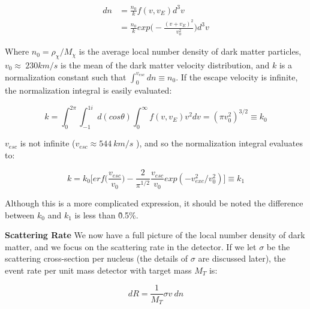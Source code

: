 \begin{equation}
\begin{split}
dn &= \frac{n_{0}}{k} f(v, v_{E}) d^{3}v \\
     &= \frac{n_{0}}{k} exp \Big( - \frac{(v + v_{E})^{2} }{ v_{0}^{2}} \Big) d^{3}v 
\end{split}
\end{equation}

Where $n_{0} = \rho_{\chi}/M_{\chi}$ is the average local number density of dark matter particles, $v_{0} \approx~230km/s$ \cite{Lewin1996} is the mean of the dark matter velocity distribution, and $k$ is a normalization constant such that $\int_{0}^{v_{esc}} dn \equiv n_{0}$. If the escape velocity is infinite, the normalization integral is easily evaluated:

\begin{equation}
k = \int_{0}^{2\pi} \int_{-1}^{1i} d(cos\theta)  \int_{0}^{\infty} f(v, v_{E}) v^{2}dv = (\pi v_{0}^{2})^{3/2} \equiv k_{0}
\end{equation}

$v_{esc}$ is not infinite ($v_{esc} \approx 544~km/s$ \cite{Baudis2014}), and so the normalization integral evaluates to:

\begin{equation}
k =  k_{0} \Big[ erf\big(\frac{v_{esc}}{v_{0}}\big) - \frac{2}{\pi^{1/2}} \frac{v_{esc}}{v_{0}} exp(- v_{exc}^{2} / v_{0}^{2} ) \Big]  \equiv k_{1}
\end{equation}

Although this is a more complicated expression, it should be noted the difference between $k_{0}$ and $k_{1}$ is less than \~0.5\%. 

\textbf{Scattering Rate} We now have a full picture of the local number density of dark matter, and we focus on the scattering rate in the detector. If we let $\sigma$ be the scattering cross-section per nucleus (the details of $\sigma$ are discussed later), the event rate per unit mass detector with target mass $M_{T}$ is:


\begin{equation}
\label{eq:rate}
dR = \frac{1}{M_{T}} \sigma  v~dn 
\end{equation}

